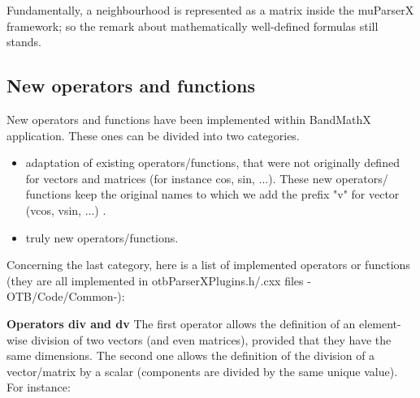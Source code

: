Fundamentally, a neighbourhood is represented as a matrix inside the 
muParserX framework; so the remark about mathematically well-defined 
formulas still stands.

\begin{center}
\end{center}


\subsection{New operators and functions}\label{ssec:operators}

New operators and functions have been implemented within 
BandMathX application. These ones can be divided into two categories.

\begin{itemize}
\item adaptation of existing operators/functions, that were not originally defined for vectors and matrices (for instance cos, sin, ...). These new operators/ functions keep the original names to which we add the prefix "v" for vector (vcos, vsin, ...) .
\item truly new operators/functions.
\end{itemize}


Concerning the last category, here is a list of implemented 
operators or functions (they are all implemented in 
otbParserXPlugins.h/.cxx files -OTB/Code/Common-):

\textbf{Operators div and dv} \newline
The first operator allows the definition of an element-wise division of two vectors (and even matrices), provided that they have the same dimensions.
The second one allows the definition of the division of a vector/matrix by a scalar (components are divided by the same unique value). For instance: 

